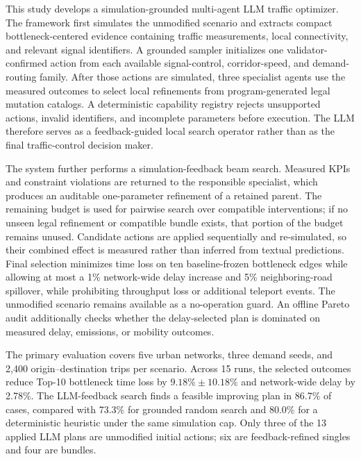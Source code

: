 \documentclass{trbunofficial}
\begin{document}
This study develops a simulation-grounded multi-agent LLM traffic optimizer.
The framework first simulates the unmodified scenario and extracts compact
bottleneck-centered evidence containing traffic measurements, local
connectivity, and relevant signal identifiers.  A grounded sampler initializes
one validator-confirmed action from each available signal-control,
corridor-speed, and demand-routing family.  After those actions are simulated,
three specialist agents use the measured outcomes to select local refinements
from program-generated legal mutation catalogs.  A deterministic capability
registry rejects unsupported actions, invalid identifiers, and incomplete
parameters before execution.  The LLM therefore serves as a feedback-guided
local search operator rather than as the final traffic-control decision maker.

The system further performs a simulation-feedback beam search.  Measured KPIs
and constraint violations are returned to the responsible specialist, which
produces an auditable one-parameter refinement of a retained parent.  The
remaining budget is used for pairwise search over compatible interventions; if
no unseen legal refinement or compatible bundle exists, that portion of the
budget remains unused.
Candidate actions are applied sequentially and re-simulated, so their combined
effect is measured rather than inferred from textual predictions.  Final
selection minimizes time loss on ten baseline-frozen bottleneck edges while
allowing at most a 1\% network-wide delay increase and 5\% neighboring-road
spillover, while prohibiting throughput loss or additional teleport events.
The unmodified scenario remains available as a no-operation guard.  An offline
Pareto audit additionally checks whether the delay-selected plan is dominated
on measured delay, emissions, or mobility outcomes.

The primary evaluation covers five urban networks, three demand seeds, and
2,400 origin--destination trips per scenario.  Across 15 runs, the selected
outcomes reduce Top-10 bottleneck time loss by $9.18\%\pm10.18\%$ and
network-wide delay by 2.78\%.  The LLM-feedback search finds a feasible
improving plan in 86.7\% of cases, compared with 73.3\% for grounded random
search and 80.0\% for a deterministic heuristic under the same simulation cap.
Only three of the 13 applied LLM plans are unmodified initial actions; six are
feedback-refined singles and four are bundles.
\end{document}

